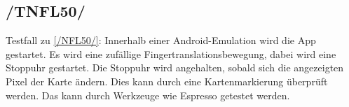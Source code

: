 \subsection*{/TNFL50/}

\label{/TNFL50/} Testfall zu \ref{/NFL50/}: Innerhalb einer \Gls{Android}-\Gls{Emulation} wird die App gestartet.
Es wird eine zufällige \Gls{Fingertranslationsbewegung}, dabei wird eine Stoppuhr gestartet.
Die Stoppuhr wird angehalten, sobald sich die angezeigten Pixel der Karte ändern.
Dies kann durch eine Kartenmarkierung überprüft werden.
Das kann durch Werkzeuge wie \Gls{Espresso} getestet werden.